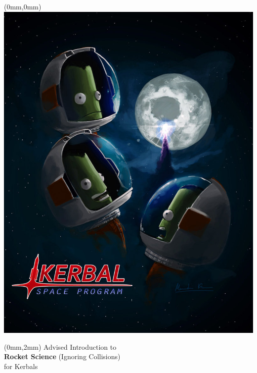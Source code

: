 \begin{titlepage}

\thispagestyle{empty}
\begin{textblock*}{\paperwidth}(0mm,0mm)
\noindent\includegraphics[height=\paperheight]{img/front.jpg}
\end{textblock*}

\begin{textblock*}{\paperwidth}(0mm,2mm){
\centering \color{title}
\fontsize{1cm}{1em}\selectfont
Advised Introduction to \\
\fontsize{2cm}{1em}\selectfont
\textbf{Rocket Science}
\fontsize{0.5cm}{1em}\selectfont
(Ignoring Collisions) \\
\fontsize{1cm}{1em}\selectfont
for Kerbals \\
}\end{textblock*}

\mbox{}
\newpage
\end{titlepage}
